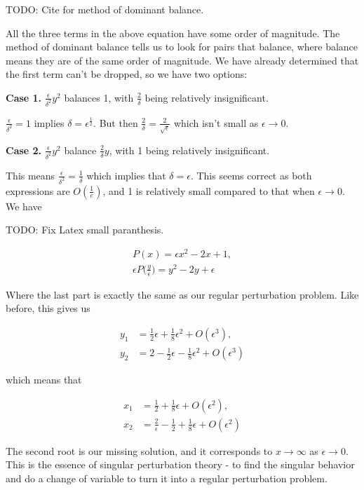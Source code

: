 \documentclass[12pt]{article}
\begin{document}
TODO: Cite for method of dominant balance.

All the three terms in the above equation have some order of magnitude. The method
of dominant balance tells us to look for pairs that balance, where balance means
they are of the same order of magnitude. We have already determined that the
first term can't be dropped, so we have two options:

\textbf{Case 1.} $\frac{\epsilon}{\delta^2} y^2$ balances 1, with $\frac{2}{\delta}$
being relatively insignificant.

$\frac{\epsilon}{\delta^2} = 1$ implies $\delta = \epsilon^{\frac{1}{2}}$. But
then $\frac{2}{\delta} = \frac{2}{\sqrt{\epsilon}}$ which isn't small as
$\epsilon \to 0$.

\textbf{Case 2.} $\frac{\epsilon}{\delta^2} y^2$ balance $\frac{2}{\delta} y$,
with 1 being relatively insignificant.

This means $\frac{\epsilon}{\delta^2} = \frac{1}{\delta}$ which implies that
$\delta = \epsilon$. This seems correct as both expressions are
$O(\frac{1}{e})$, and 1 is relatively small compared to that when $\epsilon \to
0$. We have

TODO: Fix Latex small paranthesis.

\begin{align}
P(x) = \epsilon x^2 - 2x + 1, \\
\epsilon P\Big(\frac{y}{\epsilon}\Big) = y^2 - 2 y + \epsilon
\end{align}

Where the last part is exactly the same as our regular perturbation problem.
Like before, this gives us

\begin{align}
y_1 &= \frac{1}{2} \epsilon + \frac{1}{8} \epsilon^2 + O(\epsilon^3), \\
y_2 &= 2 - \frac{1}{2} \epsilon - \frac{1}{8} \epsilon^2 + O(\epsilon^3)
\end{align}

which means that

\begin{align}
x_1 &= \frac{1}{2} + \frac{1}{8} \epsilon + O(\epsilon^2), \\
x_2 &= \frac{2}{\epsilon} - \frac{1}{2} + \frac{1}{8} \epsilon + O(\epsilon^2)
\end{align}

The second root is our missing solution, and it corresponds to $x \to \infty$ as
$\epsilon \to 0$. This is the essence of singular perturbation theory - to find
the singular behavior and do a change of variable to turn it into a regular
perturbation problem.
\end{document}
